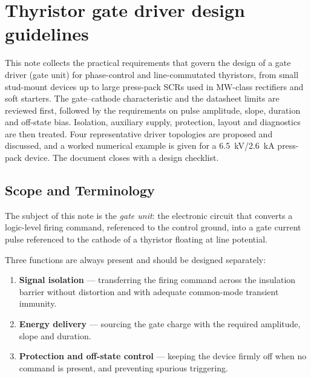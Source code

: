 \chapter{Thyristor gate driver design guidelines}
\label{ch:thygate}
\begin{chapabstract}
\noindent
This note collects the practical requirements that govern the design of a gate
driver (gate unit) for phase-control and line-commutated thyristors, from small
stud-mount devices up to large press-pack SCRs used in \si{\mega\watt}-class
rectifiers and soft starters. The gate--cathode characteristic and the datasheet
limits are reviewed first, followed by the requirements on pulse amplitude, slope,
duration and off-state bias. Isolation, auxiliary supply, protection, layout and
diagnostics are then treated. Four representative driver topologies are proposed
and discussed, and a worked numerical example is given for a
\SI{6.5}{\kilo\volt}/\SI{2.6}{\kilo\ampere} press-pack device. The document closes
with a design checklist.
\end{chapabstract}

\section{Scope and Terminology}

The subject of this note is the \emph{gate unit}: the electronic circuit that
converts a logic-level firing command, referenced to the control ground, into a
gate current pulse referenced to the cathode of a thyristor floating at line
potential.

Three functions are always present and should be designed separately:

\begin{enumerate}[label=(\roman*)]
  \item \textbf{Signal isolation} --- transferring the firing command across the
        insulation barrier without distortion and with adequate common-mode
        transient immunity.
  \item \textbf{Energy delivery} --- sourcing the gate charge with the required
        amplitude, slope and duration.
  \item \textbf{Protection and off-state control} --- keeping the device firmly
        off when no command is present, and preventing spurious triggering.
\end{enumerate}

